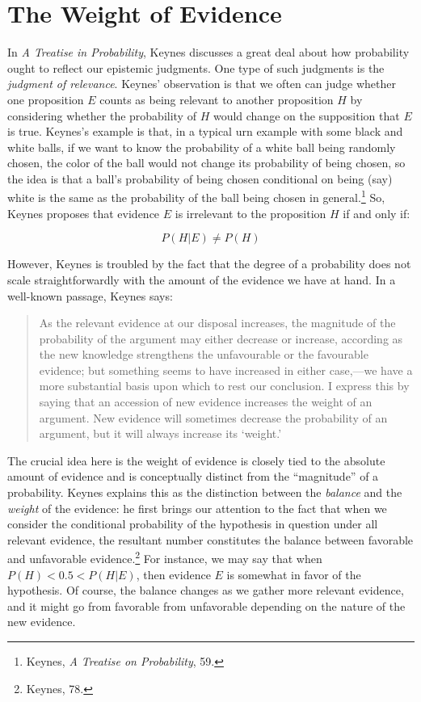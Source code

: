 \hypertarget{the-weight-of-evidence-1}{
\section{The Weight of Evidence}\label{the-weight-of-evidence-1}
}

In \emph{A Treatise in Probability}, Keynes discusses a great deal about
how probability ought to reflect our epistemic judgments. One type of
such judgments is the \emph{judgment of relevance}. Keynes' observation
is that we often can judge whether one proposition \(E\) counts as being
relevant to another proposition \(H\) by considering whether the
probability of \(H\) would change on the supposition that \(E\) is true.
Keynes's example is that, in a typical urn example with some black and
white balls, if we want to know the probability of a white ball being
randomly chosen, the color of the ball would not change its probability
of being chosen, so the idea is that a ball's probability of being
chosen conditional on being (say) white is the same as the probability
of the ball being chosen in general.\footnote{Keynes, \emph{A Treatise
  on Probability}, 59.} So, Keynes proposes that evidence \(E\) is
irrelevant to the proposition \(H\) if and only if:

\[P(H|E ) \neq P(H) \]

However, Keynes is troubled by the fact that the
degree of a probability does not scale straightforwardly with the amount
of the evidence we have at hand. In a well-known passage, Keynes says:

\begin{quote}
As the relevant evidence at our disposal increases, the magnitude of the
probability of the argument may either decrease or increase, according
as the new knowledge strengthens the unfavourable or the favourable
evidence; but something seems to have increased in either case,---we
have a more substantial basis upon which to rest our conclusion. I
express this by saying that an accession of new evidence increases the
weight of an argument. New evidence will sometimes decrease the
probability of an argument, but it will always increase its `weight.'
\end{quote}

The crucial idea here is the weight of evidence is closely tied to the
absolute amount of evidence and is conceptually distinct from the
``magnitude'' of a probability. Keynes explains this as the distinction
between the \emph{balance} and the \emph{weight} of the evidence: he
first brings our attention to the fact that when we consider the
conditional probability of the hypothesis in question under all relevant
evidence, the resultant number constitutes the balance between favorable
and unfavorable evidence.\footnote{Keynes, 78.} For instance, we may say
that when \(P(H)<0.5 <P(H|E)\), then evidence \(E\) is somewhat in favor
of the hypothesis. Of course, the balance changes as we gather more
relevant evidence, and it might go from favorable from unfavorable
depending on the nature of the new evidence.

